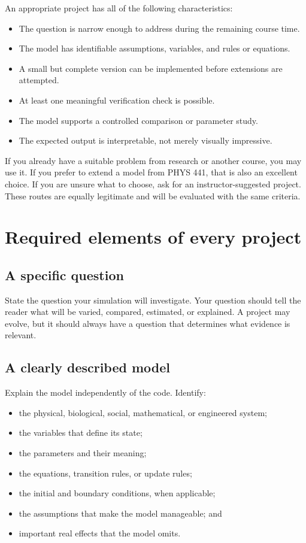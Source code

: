 \documentclass[11pt]{article}
\begin{document}
An appropriate project has all of the following characteristics:

\begin{itemize}
  \item The question is narrow enough to address during the remaining course
        time.
  \item The model has identifiable assumptions, variables, and rules or
        equations.
  \item A small but complete version can be implemented before extensions are
        attempted.
  \item At least one meaningful verification check is possible.
  \item The model supports a controlled comparison or parameter study.
  \item The expected output is interpretable, not merely visually impressive.
\end{itemize}

If you already have a suitable problem from research or another course, you may
use it. If you prefer to extend a model from PHYS 441, that is also an excellent
choice. If you are unsure what to choose, ask for an instructor-suggested
project. These routes are equally legitimate and will be evaluated with the
same criteria.

\section{Required elements of every project}

\subsection{A specific question}

State the question your simulation will investigate. Your question should tell
the reader what will be varied, compared, estimated, or explained. A project may
evolve, but it should always have a question that determines what evidence is
relevant.

\subsection{A clearly described model}

Explain the model independently of the code. Identify:

\begin{itemize}
  \item the physical, biological, social, mathematical, or engineered system;
  \item the variables that define its state;
  \item the parameters and their meaning;
  \item the equations, transition rules, or update rules;
  \item the initial and boundary conditions, when applicable;
  \item the assumptions that make the model manageable; and
  \item important real effects that the model omits.
\end{itemize}
\end{document}
